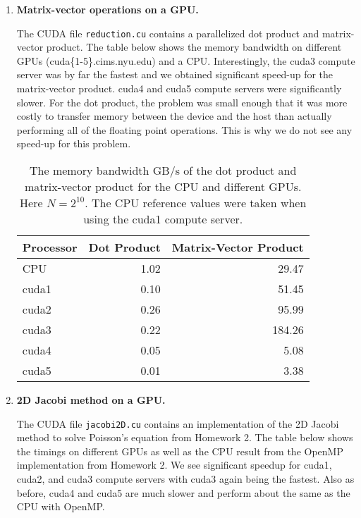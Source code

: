 \documentclass[12pt]{article}
\begin{document}
\begin{enumerate}


\item {\bf Matrix-vector operations on a GPU.} 

\par The CUDA file {\tt reduction.cu} contains a parallelized dot product and matrix-vector product.  The table below shows the memory bandwidth on different GPUs (cuda\{1-5\}.cims.nyu.edu) and a CPU.  Interestingly, the cuda3 compute server was by far the fastest and we obtained significant speed-up for the matrix-vector product.  cuda4 and cuda5 compute servers were significantly slower.  For the dot product, the problem was small enough that it was more costly to transfer memory between the device and the host than actually performing all of the floating point operations.  This is why we do not see any speed-up for this problem.

\begin{table}[H]
\centering
\begin{tabular}{| l | r | r|}
\hline
Processor & Dot Product & Matrix-Vector Product \\
\hline
CPU &  1.02 & 29.47 \\
\hline
cuda1 & 0.10 & 51.45 \\
\hline
cuda2 & 0.26 & 95.99 \\
\hline
cuda3 & 0.22 & 184.26\\
\hline
cuda4 & 0.05 & 5.08 \\
\hline
cuda5 & 0.01 & 3.38 
\\
\hline
\end{tabular}
\caption{The memory bandwidth GB/s of the dot product and matrix-vector product for the CPU and different GPUs.  Here $N = 2^{10}$.  The CPU reference values were taken when using the cuda1 compute server.}
\end{table}

  
\item {\bf 2D Jacobi method on a GPU.}

\par The CUDA file {\tt jacobi2D.cu} contains an implementation of the 2D Jacobi method to solve Poisson's equation from Homework 2.  The table below shows the timings on different GPUs as well as the CPU result from the OpenMP implementation from Homework 2.  We see significant speedup for cuda1, cuda2, and cuda3 compute servers with cuda3 again being the fastest.  Also as before, cuda4 and cuda5 are much slower and perform about the same as the CPU with OpenMP.
  

\end{enumerate}
\end{document}
